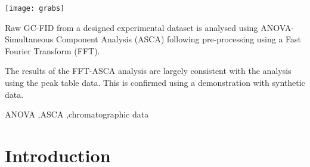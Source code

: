 \documentclass[preprint,12pt]{elsarticle}
\begin{document}
\begin{frontmatter}
\begin{graphicalabstract}
\texttt{[image: grabs]}
\end{graphicalabstract}

\begin{highlights}
\item Raw GC-FID from a designed experimental dataset is analysed using ANOVA-Simultaneous Component Analysis (ASCA) following pre-processing using a Fast Fourier Transform (FFT).
\item The results of the FFT-ASCA analysis are largely consistent with the analysis using the peak table data. This is confirmed using a demonstration with synthetic data.
\end{highlights}

\begin{keyword}
ANOVA \sep ASCA \sep chromatographic data

\end{keyword}

\end{frontmatter}


\section{Introduction}
\label{sec:sample1}
\end{document}
